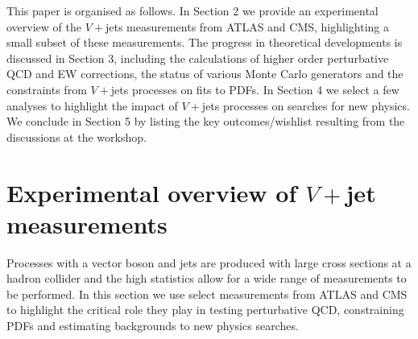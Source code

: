 \documentclass[a4paper,11pt,notoc]{article}
\newcommand{\rT}{\mathrm{T}}
\begin{document}
This paper is organised as follows. In Section 2 we provide an experimental overview of the $V+$jets measurements from ATLAS and CMS, highlighting a small subset of these measurements. The progress in theoretical developments is discussed in Section 3, including the calculations of higher order perturbative QCD and EW corrections, the status of various Monte Carlo generators and the constraints from $V+$jets processes on fits to PDFs. In Section 4 we select a few analyses to highlight the impact of $V+$jets processes on searches for new physics. We conclude in Section 5 by listing the key outcomes/wishlist resulting from the discussions at the workshop.







\section{Experimental overview of $V+$jet measurements}
Processes with a vector boson and jets are produced with large cross sections at a hadron collider and the high statistics allow for a wide range of measurements to be performed. In this section we use select measurements from ATLAS and CMS to highlight the critical role they play in testing perturbative QCD, constraining PDFs and estimating backgrounds to new physics searches. 
\end{document}
